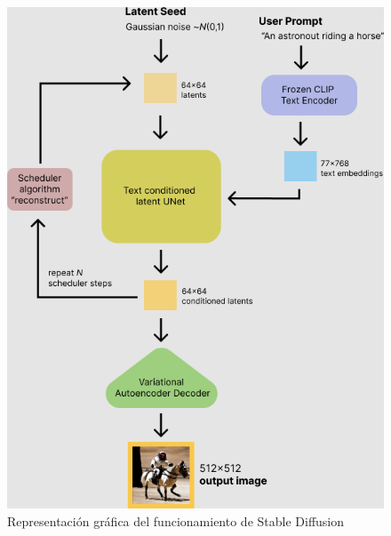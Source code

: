 \begin{figure}[!hbt]
	\centering
	\includegraphics[width = 0.9
	\textwidth]{Imagenes/Vectorial/representacionvisualSD.png}
	\caption{Representación gráfica del funcionamiento de Stable Diffusion}
	\label{fig:sd}
\end{figure}

